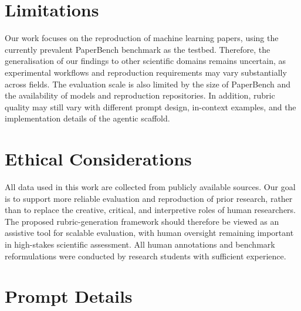 \documentclass[11pt]{article}
\begin{document}
\section*{Limitations}

Our work focuses on the reproduction of machine learning papers, using the currently prevalent PaperBench benchmark as the testbed. Therefore, the generalisation of our findings to other scientific domains remains uncertain, as experimental workflows and reproduction requirements may vary substantially across fields. The evaluation scale is also limited by the size of PaperBench and the availability of models and reproduction repositories. In addition, rubric quality may still vary with different prompt design, in-context examples, and the implementation details of the agentic scaffold.

\section*{Ethical Considerations}

All data used in this work are collected from publicly available sources. Our goal is to support more reliable evaluation and reproduction of prior research, rather than to replace the creative, critical, and interpretive roles of human researchers. The proposed rubric-generation framework should therefore be viewed as an assistive tool for scalable evaluation, with human oversight remaining important in high-stakes scientific assessment. All human annotations and benchmark reformulations were conducted by research students with sufficient experience.




\appendix


\onecolumn
\section{Prompt Details}
\label{app:prompts}
\end{document}

